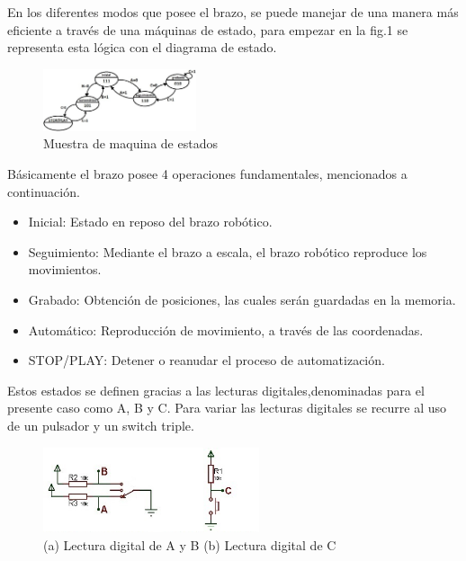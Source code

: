 \documentclass[gra_conf.tex]{subfiles}
\begin{document}
En los diferentes modos que posee el brazo, se puede manejar de una manera 
más eficiente a través de una máquinas de estado, para empezar en la fig.1 
se representa esta lógica con el diagrama de estado.

\begin{figure}[h]
  \centering
  \includegraphics[width=0.4\textwidth]{../img/machine.jpg}
  \caption{Muestra de maquina de estados}
  \label{state_machine_lol}
\end{figure}

Básicamente el brazo posee 4 operaciones fundamentales, mencionados a 
continuación.

\begin{itemize}
\item Inicial: Estado en reposo del brazo robótico.

\item Seguimiento: Mediante el brazo a escala, el brazo robótico reproduce 
los movimientos. 

\item Grabado: Obtención de posiciones, las cuales serán guardadas en la 
memoria.

\item Automático: Reproducción de movimiento, a través de las coordenadas.

\item STOP/PLAY: Detener o reanudar el proceso de automatización.

\end{itemize}

Estos estados se definen gracias a las lecturas digitales,denominadas para 
el presente caso como A, B y C. Para variar las lecturas digitales se 
recurre al uso de un pulsador y un switch triple.

\begin{figure}[h]
\centering
  \includegraphics[width=2.5in]{../img/final_abc.jpg}
  \begin{center}
  \caption{ (a) Lectura digital de A y B  (b) Lectura digital de C}
  \end{center}
  \label{final_abc}
\end{figure}
\end{document}
